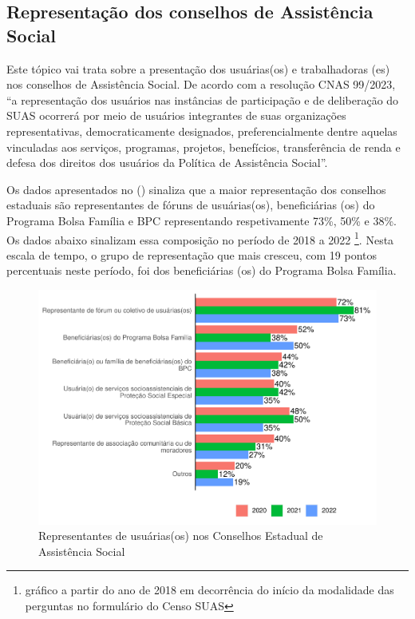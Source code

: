 \documentclass[
  brazilian]{report}
\begin{document}
\hypertarget{representauxe7uxe3o-dos-conselhos-de-assistuxeancia-social}{%
\subsection{Representação dos conselhos de Assistência
Social}\label{representauxe7uxe3o-dos-conselhos-de-assistuxeancia-social}}

Este tópico vai trata sobre a presentação dos usuárias(os) e
trabalhadoras (es) nos conselhos de Assistência Social. De acordo com a
resolução CNAS 99/2023, ``a representação dos usuários nas instâncias de
participação e de deliberação do SUAS ocorrerá por meio de usuários
integrantes de suas organizações representativas, democraticamente
designados, preferencialmente dentre aquelas vinculadas aos serviços,
programas, projetos, benefícios, transferência de renda e defesa dos
direitos dos usuários da Política de Assistência Social''.

Os dados apresentados no () sinaliza que a maior
representação dos conselhos estaduais são representantes de fóruns de
usuárias(os), beneficiárias (os) do Programa Bolsa Família e BPC
representando respetivamente 73\%, 50\% e 38\%. Os dados abaixo
sinalizam essa composição no período de 2018 a 2022
\footnote{gráfico a partir do ano de 2018 em decorrência do início da modalidade das perguntas no formulário do Censo SUAS}.
Nesta escala de tempo, o grupo de representação que mais cresceu, com 19
pontos percentuais neste período, foi dos beneficiárias (os) do Programa
Bolsa Família.

\begin{figure}
\includegraphics{Censo-SUAS-2022_files/figure-latex/usu_ceas-1} \caption[Representantes de usuárias(os) nos Conselhos Estadual de Assistência Social]{Representantes de usuárias(os) nos Conselhos Estadual de Assistência Social}\label{fig:usu_ceas}
\end{figure}
\end{document}

